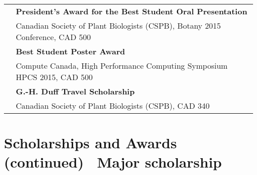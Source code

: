 \documentclass[letterpaper,12pt]{article}
\begin{document}
\begin{tabularx}{\textwidth}{@{}r|X@{}}
& \textbf{President's Award for the Best Student Oral Presentation} \\
& Canadian Society of Plant Biologists (CSPB), Botany 2015 Conference, CAD 500
  \vspace{1.3mm} \\

& \textbf{Best Student Poster Award} \\
& Compute Canada, High Performance Computing Symposium HPCS 2015, CAD 500
  \vspace{1.3mm} \\

& \textbf{G.-H. Duff Travel Scholarship} \\
& Canadian Society of Plant Biologists (CSPB), CAD 340 \\

\end{tabularx}

\section*{Scholarships and Awards \small{(continued)}
          \hfill \small{{\mdseries\faStar}~Major scholarship}}
\end{document}
